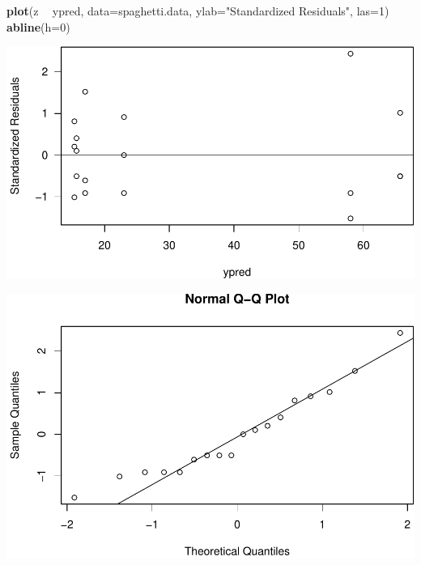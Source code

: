 \documentclass[12pt,]{article}
\newenvironment{Shaded}{\begin{snugshade}}{\end{snugshade}}
\newcommand{\KeywordTok}[1]{\textcolor[rgb]{0.13,0.29,0.53}{\textbf{#1}}}
\newcommand{\DataTypeTok}[1]{\textcolor[rgb]{0.13,0.29,0.53}{#1}}
\newcommand{\DecValTok}[1]{\textcolor[rgb]{0.00,0.00,0.81}{#1}}
\newcommand{\StringTok}[1]{\textcolor[rgb]{0.31,0.60,0.02}{#1}}
\newcommand{\CommentTok}[1]{\textcolor[rgb]{0.56,0.35,0.01}{\textit{#1}}}
\newcommand{\OperatorTok}[1]{\textcolor[rgb]{0.81,0.36,0.00}{\textbf{#1}}}
\newcommand{\NormalTok}[1]{#1}
\begin{document}
\begin{Shaded}
\begin{Highlighting}[]
\KeywordTok{plot}\NormalTok{(z }\OperatorTok{~}\StringTok{ }\NormalTok{ypred, }\DataTypeTok{data=}\NormalTok{spaghetti.data, }\DataTypeTok{ylab=}\StringTok{"Standardized Residuals"}\NormalTok{, }\DataTypeTok{las=}\DecValTok{1}\NormalTok{)}
\KeywordTok{abline}\NormalTok{(}\DataTypeTok{h=}\DecValTok{0}\NormalTok{)}
\end{Highlighting}
\end{Shaded}

\includegraphics{Markdown_HW_5_files/figure-latex/unnamed-chunk-6-3.pdf}

\begin{Shaded}
\end{Shaded}

\includegraphics{Markdown_HW_5_files/figure-latex/unnamed-chunk-6-4.pdf}
\end{document}
